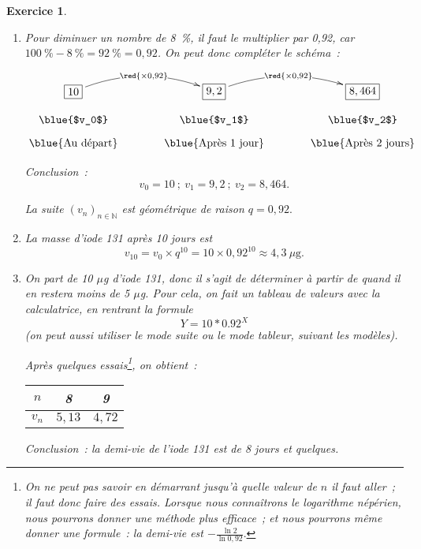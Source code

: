 \documentclass[10pt]{article}
\newtheorem{exo}{Exercice}
\begin{document}
\begin{exo}



\begin{enumerate}

\item Pour diminuer un nombre de 8~\%, il faut le multiplier par 0,92, car $100~\%-8~\%=92~\%=0,92$. On peut donc compléter le schéma~:

    \medskip


\begin{center}
    $\xymatrix@R=0.5pc@C=3pc{
    *+[F]+{10} \ar@/^0.5cm/[r]|{\red{\times 0,92}} & 
    *+[F]+{9,2} \ar@/^0.5cm/[r]|{\red{\times 0,92}} & *+[F]+{8,464} \\
    \txt{\blue{$v_0$}}&
    \txt{\blue{$v_1$}}&\txt{\blue{$v_2$}}\\
    \txt{\blue{Au départ}}&
    \txt{\blue{Après 1 jour}}&\txt{\blue{Après 2 jours}}
    }$
    \end{center}
   
   Conclusion~: 
    \[v_0=10~;~v_1=9,2~;~v_2=8,464.\]
    
    \medskip

La suite $(v_n)_{n\in\mathbb{N}}$ est géométrique de raison $q=0,92.$
\item La masse d'iode 131 après 10 jours est
\[v_{10}=v_0\times q^{10}=10\times 0,92^{10}\approx 4,3~\mu\text{g}.\]
\item On part de 10 $\mu$g d'iode 131, donc il s'agit de déterminer à partir de quand il en restera moins de 5 $\mu$g. Pour cela, on fait un tableau de valeurs avec la calculatrice, en rentrant la formule 
\[Y=10* 0.92^X\]
(on peut aussi utiliser le mode suite ou le mode tableur, suivant les modèles).

\medskip

Après quelques essais\footnote{On ne peut pas savoir en démarrant jusqu'à quelle valeur de $n$ il faut aller~; il faut donc faire des essais. Lorsque nous connaîtrons le logarithme népérien, nous pourrons donner une méthode plus efficace~; et nous pourrons même donner une formule~: la demi-vie est $-\frac{\ln 2}{\ln 0,92}.$}, on obtient~:

\begin{center}
\begin{tabular}{|c|c|c|}
\hline
	$n$&8&9\\\hline
$v_n$&$5,13$&$4,72$\\\hline
\end{tabular}
\end{center}

\medskip

Conclusion~: la demi-vie de l'iode 131 est de 8 jours et quelques.
\end{enumerate}

\end{exo}
\end{document}
